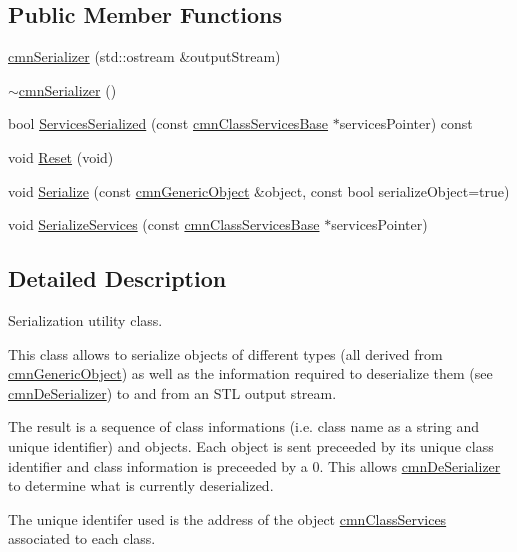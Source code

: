 \subsection*{Public Member Functions}
\begin{DoxyCompactItemize}
\item 
\hyperlink{classcmn_serializer_a5d6d5a3dbf7e90f2bb187564c31dd72e}{cmn\-Serializer} (std\-::ostream \&output\-Stream)
\item 
\hyperlink{classcmn_serializer_a02941ff3aaf78477e281c8510b8824c0}{$\sim$cmn\-Serializer} ()
\item 
bool \hyperlink{classcmn_serializer_a731785a2b18be7dff2dee525efdda9ba}{Services\-Serialized} (const \hyperlink{classcmn_class_services_base}{cmn\-Class\-Services\-Base} $\ast$services\-Pointer) const 
\item 
void \hyperlink{classcmn_serializer_a03a51b502479952c7d34692895cafdb9}{Reset} (void)
\item 
void \hyperlink{classcmn_serializer_a16b44e63b25af4f6512ac8346956dd05}{Serialize} (const \hyperlink{classcmn_generic_object}{cmn\-Generic\-Object} \&object, const bool serialize\-Object=true)
\item 
void \hyperlink{classcmn_serializer_a39f03c6babcf90492cdc736307407537}{Serialize\-Services} (const \hyperlink{classcmn_class_services_base}{cmn\-Class\-Services\-Base} $\ast$services\-Pointer)
\end{DoxyCompactItemize}


\subsection{Detailed Description}
Serialization utility class.

This class allows to serialize objects of different types (all derived from \hyperlink{classcmn_generic_object}{cmn\-Generic\-Object}) as well as the information required to deserialize them (see \hyperlink{classcmn_de_serializer}{cmn\-De\-Serializer}) to and from an S\-T\-L output stream. 

The result is a sequence of class informations (i.\-e. class name as a string and unique identifier) and objects. Each object is sent preceeded by its unique class identifier and class information is preceeded by a 0. This allows \hyperlink{classcmn_de_serializer}{cmn\-De\-Serializer} to determine what is currently deserialized.

The unique identifer used is the address of the object \hyperlink{classcmn_class_services}{cmn\-Class\-Services} associated to each class.

